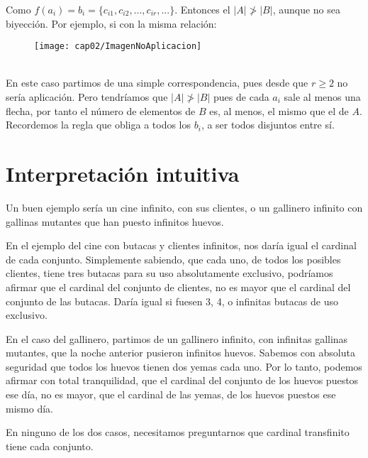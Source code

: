 Como $f(a_{i}) = b_{i} = \{c_{i1}, c_{i2}, ... , c_{ir}, ... \}$. Entonces el $|A| \ngtr |B|$, aunque no sea biyección.
\newpage
Por ejemplo, si con la misma relación:
\begin{figure}[h!]
	\texttt{[image: cap02/ImagenNoAplicacion]}
	\centering
\end{figure}\\

En este caso partimos de una simple correspondencia, pues desde que $r\geq 2$ no sería aplicación. Pero tendríamos que $|A| \ngtr |B|$ pues de cada $a_{i}$ sale al menos una flecha, por tanto el número de elementos de $B$ es, al menos, el mismo que el de $A$. Recordemos la regla que obliga a todos los $b_{i}$, a ser todos disjuntos entre sí.



\section{Interpretación intuitiva}
Un buen ejemplo sería un cine infinito, con sus clientes, o un gallinero infinito con gallinas mutantes que han puesto infinitos huevos.

En el ejemplo del cine con butacas y clientes infinitos, nos daría igual el cardinal de cada conjunto. Simplemente sabiendo, que cada uno, de todos los posibles clientes, tiene tres butacas para su uso absolutamente exclusivo, podríamos afirmar que el cardinal del conjunto de clientes, no es mayor que el cardinal del conjunto de las butacas. Daría igual si fuesen 3, 4, o infinitas butacas de uso exclusivo.

En el caso del gallinero, partimos de un gallinero infinito, con infinitas gallinas mutantes, que la noche anterior pusieron infinitos huevos. Sabemos con absoluta seguridad que todos los huevos tienen dos yemas cada uno. Por lo tanto, podemos afirmar con total tranquilidad, que el cardinal del conjunto de los huevos puestos ese día, no es mayor, que el cardinal de las yemas, de los huevos puestos ese mismo día.

En ninguno de los dos casos, necesitamos preguntarnos que cardinal transfinito tiene cada conjunto.\\\\

